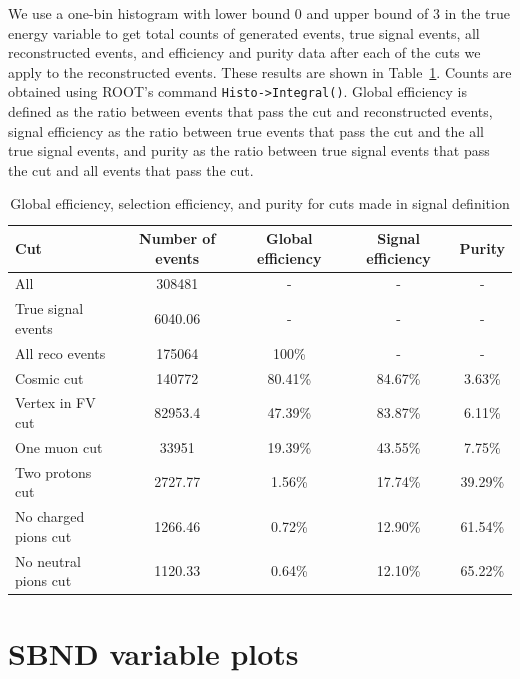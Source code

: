 \documentclass{article}
\begin{document}
We use a one-bin histogram with lower bound $0$ and upper bound of $3$ in the true energy variable to get total counts of generated events, true signal events, all reconstructed events, and efficiency and purity data after each of the cuts we apply to the reconstructed events. These results are shown in Table~\ref{table:cut-efficiency-purity}. Counts are obtained using ROOT's command \verb|Histo->Integral()|. Global efficiency is defined as the ratio between events that pass the cut and reconstructed events, signal efficiency as the ratio between true events that pass the cut and the all true signal events, and purity as the ratio between true signal events that pass the cut and all events that pass the cut.

\begin{table}
    \begin{center}
        \begin{tabular}{|l|cccc|}
        \hline
        \textbf{Cut}         & \textbf{Number of events} & \textbf{Global efficiency} & \textbf{Signal efficiency} & \textbf{Purity} \\ \hline
        All                  & 308481  & -       & -       & -      \\
        True signal events   & 6040.06 & -       & -       & -      \\
        All reco events      & 175064  & 100\%   & -       & -      \\
        Cosmic cut           & 140772  & 80.41\% & 84.67\% & 3.63\% \\
        Vertex in FV cut     & 82953.4 & 47.39\% & 83.87\% & 6.11\% \\
        One muon cut         & 33951   & 19.39\% & 43.55\% & 7.75\% \\
        Two protons cut      & 2727.77 & 1.56\%  & 17.74\% & 39.29\% \\
        No charged pions cut & 1266.46 & 0.72\%  & 12.90\% & 61.54\% \\
        No neutral pions cut & 1120.33 & 0.64\%  & 12.10\% & 65.22\% \\ \hline
        \end{tabular}
    \end{center}
    \caption{Global efficiency, selection efficiency, and purity for cuts made in signal definition}
    \label{table:cut-efficiency-purity}
\end{table}

\section{SBND variable plots}
\end{document}
